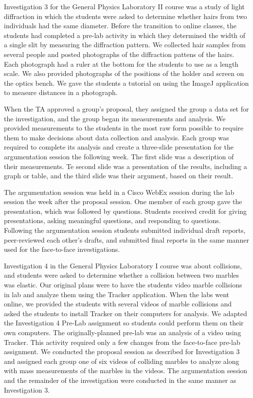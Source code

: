 \documentclass[aip, preprint, numerical]{revtex4-2}
\begin{document}
Investigation 3 for the General Physics Laboratory II course was a study of light diffraction in which the students were asked to determine whether hairs from two individuals had the same diameter. Before the transition to online classes, the students had completed a pre-lab activity in which they determined the width of a single slit by measuring the diffraction pattern. We collected hair samples from several people and posted photographs of the diffraction pattens of the hairs. Each photograph had a ruler at the bottom for the students to use as a length scale. We also provided photographs of the positions of the holder and screen on the optics bench. We gave the students a tutorial on using the ImageJ application\citep{schrasetal12} to measure distances in a photograph.

When the TA approved a group's  proposal, they assigned the group a data set for the investigation, and the group began its measurements and analysis. We provided measurements to the students in the most raw form possible to require them to make decisions about data collection and analysis. Each group was required to complete its analysis and create a three-slide presentation for the argumentation session the following week. The first slide was a description of their measurements. Te second slide was a presentation of the results, including a graph or table, and the third slide was their argument, based on their result.

The argumentation session was held in a Cisco WebEx session during the lab session the week after the proposal session. One member of each group gave the presentation, which  was followed by questions. Students received credit for giving presentations, asking meaningful questions, and responding to questions.  Following the argumentation session students submitted individual draft reports, peer-reviewed each other's drafts, and submitted final reports in the same manner used for the face-to-face investigations.

Investigation 4 in the General Physics Laboratory I course was about collisions, and students were asked to determine whether a collision between two marbles was elastic. Our original plans were to have the students video marble collisions in lab and analyze them using the Tracker application\citep{bro2009}. When the labs went online, we provided the students with several videos of marble collisions and asked the students to install Tracker on their computers for analysis.  We adapted the Investigation 4 Pre-Lab assignment so students could perform them on their own computers. The originally-planned pre-lab was an analysis of a video using Tracker. This activity required only a few changes from the face-to-face pre-lab assignment. We conducted the proposal session as described for Investigation 3 and assigned each group one of six videos of colliding marbles to analyze along with mass measurements of the marbles in the videos. The argumentation session and the remainder of the investigation were conducted in the same manner as Investigation 3.
\end{document}
